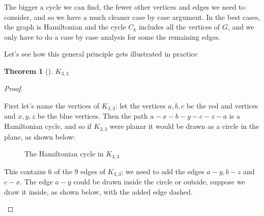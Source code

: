 \documentclass[10pt,]{book}
\theoremstyle{plain}
\newtheorem{theorem}{Theorem}[section]
\theoremstyle{definition}
\theoremstyle{definition}
\theoremstyle{definition}
\theoremstyle{definition}
\numberwithin{equation}{section}
\begin{document}
\par
\hypertarget{p-284}{}%
The bigger a cycle we can find, the fewer other vertices and edges we need to consider, and so we have a much cleaner case by case argument.  In the best cases, the graph is Hamiltonian and the cycle \(C_k\) includes all the vertices of \(G\), and we only have to do a case by case analysis for some the remaining edges.%
\par
\hypertarget{p-285}{}%
Let's see how this general principle gets illustrated in practice%
\begin{theorem}[{}]\label{theorem-7}
\(K_{3,3}\)\end{theorem}
\begin{proof}\hypertarget{proof-9}{}
\hypertarget{p-286}{}%
First let's name the vertices of \(K_{3,3}\): let the vertices \(a,b,c\) be the red and vertices and \(x,y,z\) be the blue vertices.  Then the path \(a-x-b-y-c-z-a\) is a Hamiltonian cycle, and so if \(K_{3,3}\) were planar it would be drawn as a circle in the plane, as shown below:%
\begin{figure}
\centering
{
}
\caption{The Hamiltonian cycle in \(K_{3,3}\)\label{fig_proof_k33_planar1}}
\end{figure}
\hypertarget{p-287}{}%
This contains 6 of the 9 edges of \(K_{3,3}\); we need to add the edges \(a-y, b-z\) and \(c-x\).  The edge \(a-y\) could be drawn inside the circle or outside, suppose we draw it inside, as shown below, with the added edge dashed.%
\begin{figure}
\centering
{
}
\end{figure}
\end{proof}
\end{document}
